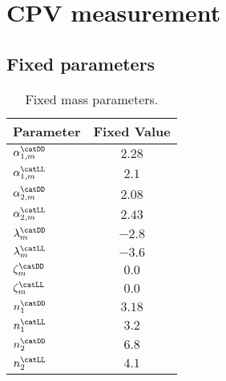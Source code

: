 
\chapter{CPV measurement}
\label{ch:app:measurement_of_sin2beta:cpv_measurement}

\section{Fixed parameters}
\label{sec:app:measurement_of_sin2beta:cpv_measurement:fixed_parameters}

\begin{table}[htb]
\caption{Fixed mass parameters.}
\label{tab:app:measurement_of_sin2beta:cpv_measurement:fixed_parameters:mass}
\centering
\begin{tabular}{lr@{$\,\pm\,$}l}
  \toprule
  Parameter                     & \multicolumn{2}{c}{Fixed Value} \\
  \midrule
  $\alpha_{1,m}^\text{\catDD}$      & \multicolumn{2}{c}{$2.28$}\\
  $\alpha_{1,m}^\text{\catLL}$      & \multicolumn{2}{c}{$2.1$}\\
  $\alpha_{2,m}^\text{\catDD}$      & \multicolumn{2}{c}{$2.08$}\\
  $\alpha_{2,m}^\text{\catLL}$      & \multicolumn{2}{c}{$2.43$}\\
  $\lambda_m^\text{\catDD}$         & \multicolumn{2}{c}{$-2.8$}\\
  $\lambda_m^\text{\catLL}$         & \multicolumn{2}{c}{$-3.6$}\\
  $\zeta_m^\text{\catDD}$           & \multicolumn{2}{c}{$0.0$}\\
  $\zeta_m^\text{\catLL}$           & \multicolumn{2}{c}{$0.0$}\\
  $n_1^\text{\catDD}$               & \multicolumn{2}{c}{$3.18$}\\
  $n_1^\text{\catLL}$               & \multicolumn{2}{c}{$3.2$}\\
  $n_2^\text{\catDD}$               & \multicolumn{2}{c}{$6.8$}\\
  $n_2^\text{\catLL}$               & \multicolumn{2}{c}{$4.1$}\\
  \bottomrule
\end{tabular}
\end{table}
%
